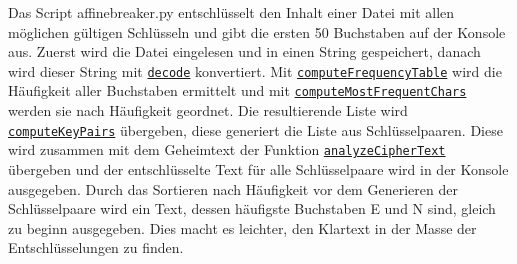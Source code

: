 \documentclass[12pt]{article}
\begin{document}
		Das Script affinebreaker.py entschl\"usselt den Inhalt einer Datei mit allen m\"oglichen g\"ultigen Schl\"usseln und gibt die ersten 50 Buchstaben auf der Konsole aus. 
Zuerst wird die Datei eingelesen und in einen String gespeichert, danach wird dieser String mit \hyperref[ssec:Aufgabe1]{\texttt{decode}} konvertiert.
Mit \hyperref[ssec:Aufgabe11]{\texttt{computeFrequencyTable}} wird die H\"aufigkeit aller Buchstaben ermittelt und mit \hyperref[ssec:Aufgabe13]{\texttt{computeMostFrequentChars}} werden sie nach H\"aufigkeit geordnet.
Die resultierende Liste wird \hyperref[ssec:Aufgabe14]{\texttt{computeKeyPairs}} \"ubergeben, diese generiert die Liste aus Schl\"usselpaaren. Diese wird zusammen  mit dem Geheimtext der Funktion \hyperref[ssec:Aufgabe15]{\texttt{analyzeCipherText}} \"ubergeben 
und der entschl\"usselte Text f\"ur alle Schl\"usselpaare wird in der Konsole ausgegeben.
Durch das Sortieren nach H\"aufigkeit vor dem Generieren der Schl\"usselpaare wird ein Text, dessen h\"aufigste Buchstaben E und N sind, gleich zu beginn ausgegeben. Dies macht es leichter, den Klartext in der Masse der Entschl\"usselungen zu finden.
		
	
\end{document}
